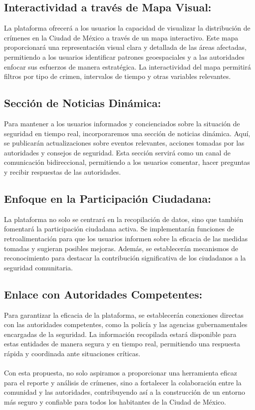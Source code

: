 \documentclass{article}
\begin{document}
    \subsection{Interactividad a través de Mapa Visual:}
    La plataforma ofrecerá a los usuarios la capacidad de visualizar la distribución de crímenes en la Ciudad de México a través de un mapa interactivo. Este mapa proporcionará una representación visual clara y detallada de las áreas afectadas, permitiendo a los usuarios identificar patrones geoespaciales y a las autoridades enfocar sus esfuerzos de manera estratégica. La interactividad del mapa permitirá filtros por tipo de crimen, intervalos de tiempo y otras variables relevantes.

    \subsection{Sección de Noticias Dinámica:}
    Para mantener a los usuarios informados y concienciados sobre la situación de seguridad en tiempo real, incorporaremos una sección de noticias dinámica. Aquí, se publicarán actualizaciones sobre eventos relevantes, acciones tomadas por las autoridades y consejos de seguridad. Esta sección servirá como un canal de comunicación bidireccional, permitiendo a los usuarios comentar, hacer preguntas y recibir respuestas de las autoridades.

    \subsection{Enfoque en la Participación Ciudadana:}
    La plataforma no solo se centrará en la recopilación de datos, sino que también fomentará la participación ciudadana activa. Se implementarán funciones de retroalimentación para que los usuarios informen sobre la eficacia de las medidas tomadas y sugieran posibles mejoras. Además, se establecerán mecanismos de reconocimiento para destacar la contribución significativa de los ciudadanos a la seguridad comunitaria.

    \subsection{Enlace con Autoridades Competentes:}
    Para garantizar la eficacia de la plataforma, se establecerán conexiones directas con las autoridades competentes, como la policía y las agencias gubernamentales encargadas de la seguridad. La información recopilada estará disponible para estas entidades de manera segura y en tiempo real, permitiendo una respuesta rápida y coordinada ante situaciones críticas.
\\\\
Con esta propuesta, no solo aspiramos a proporcionar una herramienta eficaz para el reporte y análisis de crímenes, sino a fortalecer la colaboración entre la comunidad y las autoridades, contribuyendo así a la construcción de un entorno más seguro y confiable para todos los habitantes de la Ciudad de México.
\end{document}
